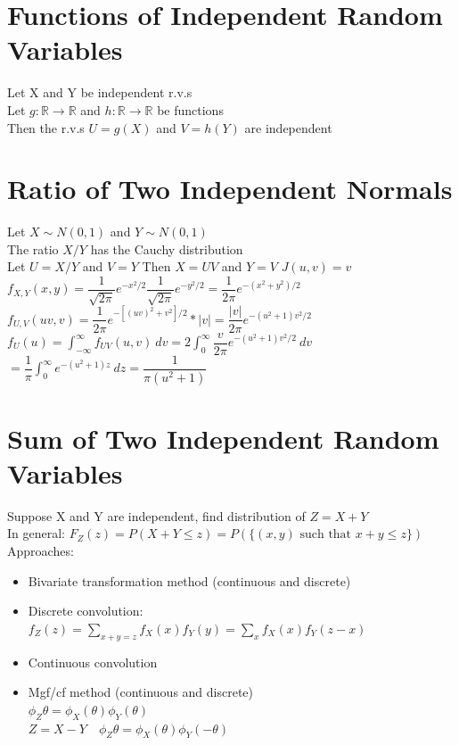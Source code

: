 \documentclass[openany]{book}
\begin{document}
\section{Functions of Independent Random Variables}
Let X and Y be independent r.v.s\\
Let $g:\mathbb{R}\to \mathbb{R}$ and $h:\mathbb{R}\to \mathbb{R}$ be functions\\
Then the r.v.s $U=g(X)$ and $V=h(Y)$ are independent
\section{Ratio of Two Independent Normals}
Let $X \sim N(0,1)$ and $Y\sim N(0,1)$\\
The ratio $X/Y$ has the Cauchy distribution\\
Let $U=X/Y$ and $V=Y$ \quad Then $X=UV$ and $Y=V$ \quad $J(u,v)=v$\\
$f_{X,Y}(x,y)=\dfrac{1}{\sqrt{2\pi}}e^{-x^2/2}\dfrac{1}{\sqrt{2\pi}}e^{-y^2/2}=\dfrac{1}{2\pi}e^{-(x^2+y^2)/2}$\\
$f_{U,V}(uv,v)=\dfrac{1}{2\pi}e^{-[(uv)^2+v^2]/2}*|v|=\dfrac{|v|}{2\pi}e^{-(u^2+1)v^2/2}$\\
$f_{U}(u)=\int_{-\infty}^{\infty}f_{UV}(u,v) \ dv=2\int_{0}^{\infty}\dfrac{v}{2\pi}e^{-(u^2+1)v^2/2} \ dv$\\
$=\dfrac{1}{\pi}\int_{0}^{\infty}e^{-(u^2+1)z} \ dz=\dfrac{1}{\pi(u^2+1)}$
\section{Sum of Two Independent Random Variables}
Suppose X and Y are independent, find distribution of $Z=X+Y$\\
In general: $F_Z(z)=P(X+Y\leq z)=P(\{(x,y) \text{ such that } x+y\leq z\})$\\
Approaches:
\begin{itemize}
\item Bivariate transformation method (continuous and discrete)\\
\item Discrete convolution:\\
$f_Z(z)=\sum_{x+y=z}f_X(x)f_Y(y)=\sum_{x}f_X(x)f_Y(z-x)$\\
\item Continuous convolution\\
\item Mgf/cf method (continuous and discrete)\\
$\phi_Z{\theta}=\phi_X(\theta)\phi_Y(\theta)$\\
$Z=X-Y \quad \phi_Z{\theta}=\phi_X(\theta)\phi_Y(-\theta)$
\end{itemize}
\end{document}

